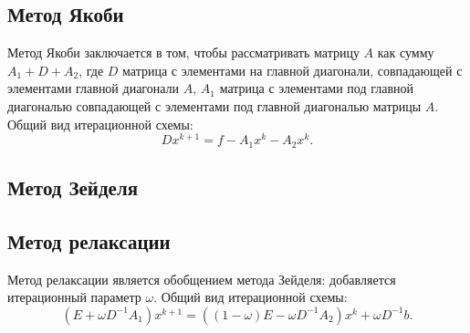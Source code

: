 \documentclass[12pt, a4paper]{article}
\begin{document}
	\subsection{Метод Якоби}
	
	Метод Якоби заключается в том, чтобы рассматривать матрицу $A$ как сумму $A_1 + D + A_2$, где $D$ матрица с элементами на главной диагонали, совпадающей с элементами главной диагонали $A$, $A_1$ матрица с элементами под главной диагональю совпадающей с элементами под главной диагональю матрицы $A$. Общий вид итерационной схемы:
	\[
	D x^{k+1} = f - A_1 x^k - A_2 x^k. 
	\]
			
	\subsection{Метод Зейделя}

	\subsection{Метод релаксации}	
	Метод релаксации является обобщением метода Зейделя: добавляется итерационный параметр $\omega$.
	Общий вид итерационной схемы:
	\[
	(E + \omega D^{-1} A_1) x^{k+1} = ((1-\omega)E - \omega D^{-1}A_2) x^{k} + \omega D^{-1}b.
	\]
	
	
\end{document}
